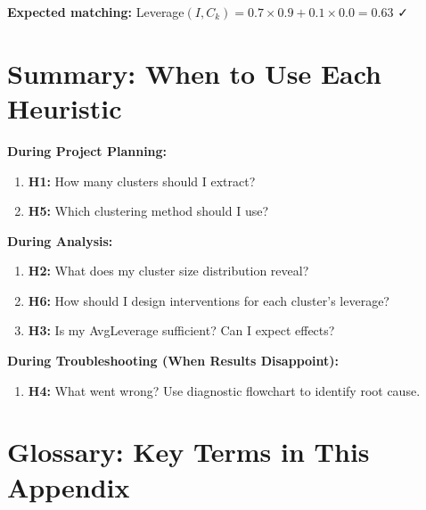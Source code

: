 \textbf{Expected matching:} Leverage$(I, C_k) = 0.7 \times 0.9 + 0.1 \times 0.0 = 0.63$ ✓


\section{Summary: When to Use Each Heuristic}
\label{sec:h-summary}

\begin{tcolorbox}[colback=green!10!white, colframe=green!75!black,
    title=Summary: Quick Decision Guide]

\textbf{During Project Planning:}
\begin{enumerate}[nosep]
\item \textbf{H1:} How many clusters should I extract?
\item \textbf{H5:} Which clustering method should I use?
\end{enumerate}

\textbf{During Analysis:}
\begin{enumerate}[nosep]
\item \textbf{H2:} What does my cluster size distribution reveal?
\item \textbf{H6:} How should I design interventions for each cluster's leverage?
\item \textbf{H3:} Is my AvgLeverage sufficient? Can I expect effects?
\end{enumerate}

\textbf{During Troubleshooting (When Results Disappoint):}
\begin{enumerate}[nosep]
\item \textbf{H4:} What went wrong? Use diagnostic flowchart to identify root cause.
\end{enumerate}

\end{tcolorbox}


\section{Glossary: Key Terms in This Appendix}
\label{sec:h-glossary}

